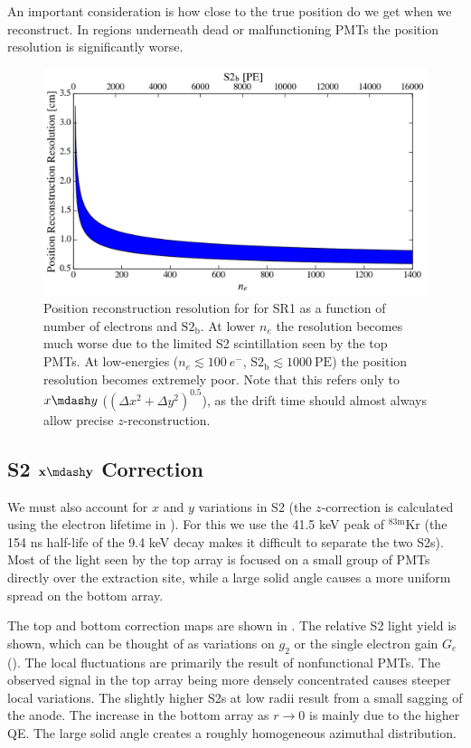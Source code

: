 An important consideration is how close to the true position do we get when we reconstruct.  In regions underneath dead or malfunctioning
PMTs the position resolution is significantly worse.

\begin{figure}
\centering
\includegraphics[width=\textwidth]{PosRecRes}
\caption{Position reconstruction resolution for for SR1 as a function of number of electrons and $\mathrm{S2_b}$.  At lower $n_e$ the
resolution becomes much worse due to the limited S2 scintillation seen by the top PMTs.  At low-energies ($n_e \lesssim 100\ e^-$,
$\mathrm{S2_b} \lesssim 1000\ \mathrm{PE}$) the position resolution becomes extremely poor.  Note that this refers only to $x \mdash y$
($(\Delta x^2 + \Delta y^2)^{0.5}$), as the drift time should almost always allow precise $z$-reconstruction.}
\label{fig:calibrations_position_reconstruction_res}
\end{figure}



\subsection{S2 $\mathbf{x \mdash y}$ Correction}
\label{subsec:det_char_s2_position_correction}
We must also account for $x$ and $y$ variations in S2 (the $z$-correction is calculated using the electron lifetime in
).  For
this we use the 41.5 keV peak of $\mathrm{^{83m}Kr}$ (the 154 ns half-life of the 9.4 keV decay makes it difficult to separate the two
S2s).  Most of the light seen by the top array is focused on a small group of PMTs directly over the extraction site, while a large
solid angle causes a more uniform spread on the bottom array.

The top and bottom correction maps are shown in .  The relative S2 light yield is shown, which can be
thought of as variations on $g_2$ or the single electron gain $G_e$ ().  The local
fluctuations are primarily the result
of nonfunctional PMTs.  The observed signal in the top array being more densely concentrated causes steeper local variations.  The
slightly higher S2s at low radii result from a small sagging of the anode.  The increase in the bottom array as $r \rightarrow 0$ is 
mainly due to the higher QE.  The large solid angle creates a roughly homogeneous azimuthal distribution.

